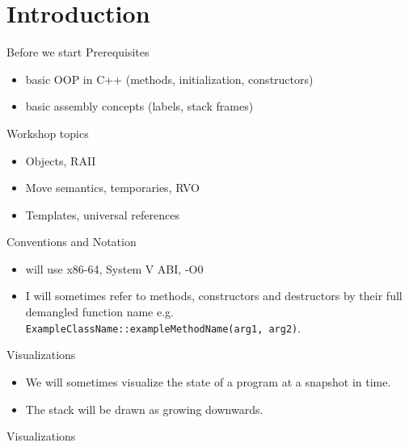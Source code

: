 \section{Introduction}

\begin{frame}[fragile]{Before we start}
  Prerequisites
  \begin{itemize}
    \item basic OOP in C++ (methods, initialization, constructors)
    \item basic assembly concepts (labels, stack frames)
  \end{itemize}

  Workshop topics
  \begin{itemize}
    \item Objects, RAII
    \item Move semantics, temporaries, RVO
    \item Templates, universal references
  \end{itemize}
\end{frame}

\begin{frame}[fragile]{Conventions and Notation}
  \begin{itemize}
    \item will use x86-64, System V ABI, -O0
    \item I will sometimes refer to methods, constructors and destructors by their full demangled function name e.g.
      \texttt{ExampleClassName::exampleMethodName(arg1, arg2)}.
  \end{itemize}
\end{frame}

\begin{frame}[fragile]{Visualizations}
  \begin{itemize}
    \item We will sometimes visualize the state of a program at a snapshot in time.
    \item The stack will be drawn as growing downwards.
  \end{itemize}
\end{frame}

\begin{frame}[fragile]{Visualizations}
  
\end{frame}
